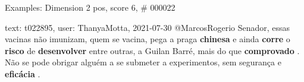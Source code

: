 \begin{frame}{Examples: Dimension 2 pos, score 6, \# 000022}
\footnotesize
\begin{exampleblock}{text: t022895, user: ThanyaMotta, 2021-07-30}
@MarcosRogerio Senador, essas vacinas não imunizam, quem se vacina, pega a 
praga \textbf{chinesa} e ainda \textbf{corre} o \textbf{risco} de 
\textbf{desenvolver} entre outras, a Guilan Barré, mais do que 
\textbf{comprovado} . Não se pode obrigar alguém a se submeter a experimentos, 
sem segurança e \textbf{eficácia} . 
\end{exampleblock}
\end{frame}
